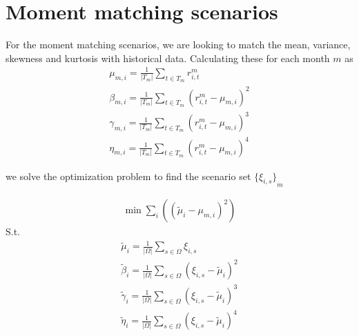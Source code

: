 \section{Moment matching scenarios}

For the moment matching scenarios, we are looking to match the mean, variance, skewness and kurtosis with historical data.
Calculating these for each month $m$ as
\begin{gather}
\mu_{m,i} = \frac{1}{|T_m|} \sum_{t \in T_m} r^m_{i,t} \\
\beta_{m,i} = \frac{1}{|T_m|} \sum_{t \in T_m} {\left( r^m_{i,t} - \mu_{m,i} \right)}^2 \\
\gamma_{m,i} = \frac{1}{|T_m|} \sum_{t \in T_m} {\left( r^m_{i,t} - \mu_{m,i} \right)}^3 \\
\eta_{m,i} = \frac{1}{|T_m|} \sum_{t \in T_m} {\left( r^m_{i,t} - \mu_{m,i} \right)}^4
\end{gather}

we solve the optimization problem to find the scenario set ${\{\xi_{i,s}\}}_{m}$

\begin{align}
\min \sum_i \left(
	{(\tilde{\mu}_i - \mu_{m,i})}^2
\right)
\label{eq:momentobj}
\end{align}
S.t.
\begin{align}
\tilde{\mu}_i = \frac{1}{|\Omega|} \sum_{s \in \Omega} \xi_{i,s} \\
\tilde\beta_i = \frac{1}{|\Omega|} \sum_{s \in \Omega} {\left( \xi_{i,s} - \tilde{\mu}_i \right)}^2 \\
\tilde\gamma_i = \frac{1}{|\Omega|} \sum_{s \in \Omega} {\left( \xi_{i,s} - \tilde{\mu}_i \right)}^3 \\
\tilde\eta_i = \frac{1}{|\Omega|} \sum_{s \in \Omega} {\left( \xi_{i,s} - \tilde{\mu}_i \right)}^4
\end{align}